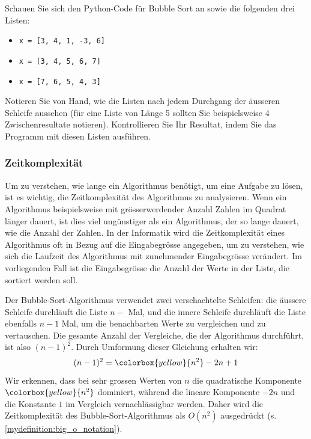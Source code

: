 
\begin{myexercise}
	Schauen Sie sich den Python-Code für Bubble Sort an sowie die folgenden drei Listen:
	\begin{itemize}
		\item \lstinline|x = [3, 4, 1, -3, 6]|
		\item \lstinline|x = [3, 4, 5, 6, 7]| %
		\item \lstinline|x = [7, 6, 5, 4, 3]|
	\end{itemize}
	Notieren Sie von Hand, wie die Listen nach jedem Durchgang der äusseren Schleife aussehen (für eine Liste von Länge 5 sollten Sie beispielsweise 4 Zwischenresultate notieren). Kontrollieren Sie Ihr Resultat, indem Sie das Programm mit diesen Listen ausführen.
	\begin{myanswer}
		
	\end{myanswer}
\end{myexercise}

\subsubsection{Zeitkomplexität}

Um zu verstehen, wie lange ein Algorithmus benötigt, um eine Aufgabe zu lösen, ist es wichtig, die Zeitkomplexität des Algorithmus zu analysieren. Wenn ein Algorithmus beispielsweise mit grösserwerdender Anzahl Zahlen im Quadrat länger dauert, ist dies viel ungünstiger als ein Algorithmus, der so lange dauert, wie die Anzahl der Zahlen. In der Informatik wird die Zeitkomplexität eines Algorithmus oft in Bezug auf die Eingabegrösse angegeben, um zu verstehen, wie sich die Laufzeit des Algorithmus mit zunehmender Eingabegrösse verändert. Im vorliegenden Fall ist die Eingabegrösse die Anzahl der Werte in der Liste, die sortiert werden soll.

Der Bubble-Sort-Algorithmus verwendet zwei verschachtelte Schleifen: die äussere Schleife durchläuft die Liste \(n-\) Mal, und die innere Schleife durchläuft die Liste ebenfalls \(n-1\) Mal, um die benachbarten Werte zu vergleichen und zu vertauschen. Die gesamte Anzahl der Vergleiche, die der Algorithmus durchführt, ist also \((n-1)^2\). Durch Umformung dieser Gleichung erhalten wir:
\[(n-1)^2=\colorbox{yellow}{\ensuremath{n^2}}-2n+1\]
Wir erkennen, dass bei sehr grossen Werten von \(n\) die quadratische Komponente \(\colorbox{yellow}{\ensuremath{n^2}}\) dominiert, während die lineare Komponente \(-2n\) und die Konstante \(1\) im Vergleich vernachlässigbar werden. Daher wird die Zeitkomplexität des Bubble-Sort-Algorithmus als \(O(n^2)\) ausgedrückt (s. \cref{mydefinition:big_o_notation}).


